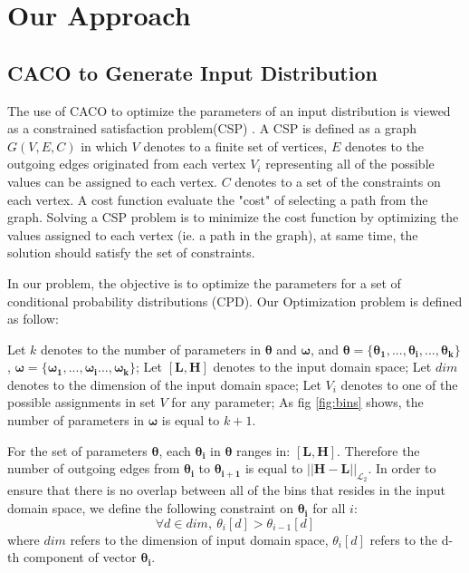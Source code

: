 \documentclass[journal]{IEEEtran}
\renewcommand{\vec}[1]{\mathbf{#1}}
\begin{document}
\section{Our Approach}
\subsection{CACO to Generate Input Distribution}
The use of CACO to optimize the parameters of an input distribution is viewed as a constrained satisfaction problem(CSP) \cite{acocsp}. A CSP is defined as a graph \(G(V,E,C)\) in which \(V \) denotes to a finite set of vertices, \(E\) denotes to the outgoing edges originated from each vertex \(V_{i}\) representing all of the possible values can be assigned to each vertex. \(C\) denotes to a set of the constraints on each vertex. A cost function evaluate the "cost" of selecting a path from the graph. Solving a CSP problem is to minimize the cost function by optimizing the values assigned to each vertex (ie. a path in the graph), at same time, the solution should satisfy the set of constraints.

In our problem, the objective is to optimize the parameters for a set of conditional probability distributions (CPD). Our Optimization problem is defined as follow:

 Let \(k\) denotes to the number of parameters in \(\vec{\theta}\) and \(\vec{\omega}\), and \(\vec{\theta} =\{ \vec{\theta_{1}},...,\vec{\theta_{i}},...,\vec{\theta_{k}}\}\),  \(\vec{\omega} = \{\vec{\omega_{1}},...,\vec{\omega_{i}}...,\vec{\omega_{k}}\}\); Let \([\vec{L},\vec{H}]\) denotes to the input domain space; Let \(dim\) denotes to the dimension of the input domain space; Let \(V_{i}\) denotes to one of the possible assignments in set \(V\) for any parameter; As fig \ref{fig:bins} shows, the number of parameters in \(\vec{\omega}\) is equal to \(k+1\).


For the set of parameters \(\vec{\theta}\), each \(\vec{\theta_{i}}\) in \(\vec{\theta}\) ranges in: \([\vec{L},\vec{H}]\). Therefore the number of outgoing edges from \(\vec{\theta_{i}}\) to \(\vec{\theta_{i+1}}\) is equal to \(||\vec{H}-\vec{L}||_{\mathcal{L}_{2}}\). In order to ensure that there is no overlap between all of the bins that resides in the input domain space, we define the following constraint on \(\vec{\theta_{i}}\) for all \(i\):
\[\forall d \in dim ,\ \theta_{i}[d] > \theta_{i-1}[d]\]
where \(dim\) refers to the dimension of input domain space, \(\theta_{i}[d]\) refers to the d-th component of vector \(\vec{\theta_{i}}\).\\
\end{document}
